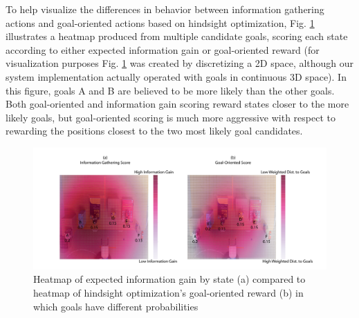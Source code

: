 \documentclass[conference]{IEEEtran}
\begin{document}
To help visualize the differences in behavior between information gathering actions and goal-oriented actions based on hindsight optimization, %
Fig. \ref{heatmap2} illustrates a heatmap produced from multiple candidate goals, scoring each state according to either expected information gain or goal-oriented reward (for visualization purposes Fig. \ref{heatmap2} was created by discretizing a 2D space, although our system implementation actually operated with goals in continuous 3D space). In this figure, goals A and B are believed to be more likely than the other goals. Both goal-oriented and information gain scoring reward states closer to the more likely goals, but goal-oriented scoring is much more aggressive with respect to rewarding the positions closest to the two most likely goal candidates.



\begin{figure}
\includegraphics[width=\columnwidth]{figures/Heatmap_Uneven_Belief.pdf}
\caption{Heatmap of expected information gain by state (a) compared to heatmap of hindsight optimization's goal-oriented reward (b) in which goals have different probabilities}
\label{heatmap2}
\end{figure}
\end{document}
